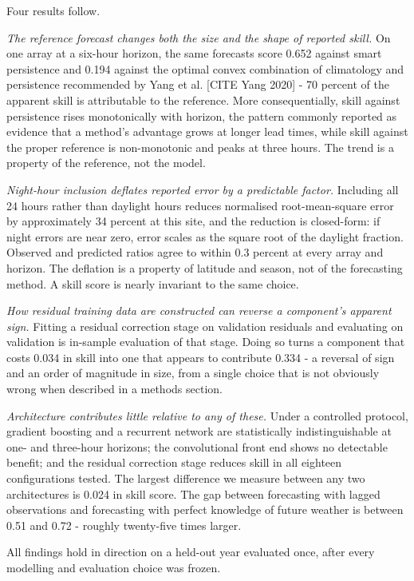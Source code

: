 Four results follow.

\textit{The reference forecast changes both the size and the shape of reported
skill.} On one array at a six-hour horizon, the same forecasts score
0.652 against smart persistence and 0.194 against the optimal convex
combination of climatology and persistence recommended by Yang et al.
[CITE Yang 2020] - 70 percent of the apparent skill is attributable to
the reference. More consequentially, skill against persistence rises
monotonically with horizon, the pattern commonly reported as evidence
that a method's advantage grows at longer lead times, while skill
against the proper reference is non-monotonic and peaks at three hours.
The trend is a property of the reference, not the model.

\textit{Night-hour inclusion deflates reported error by a predictable factor.}
Including all 24 hours rather than daylight hours reduces normalised
root-mean-square error by approximately 34 percent at this site, and
the reduction is closed-form: if night errors are near zero, error
scales as the square root of the daylight fraction. Observed and
predicted ratios agree to within 0.3 percent at every array and horizon.
The deflation is a property of latitude and season, not of the
forecasting method. A skill score is nearly invariant to the same
choice.

\textit{How residual training data are constructed can reverse a component's
apparent sign.} Fitting a residual correction stage on validation
residuals and evaluating on validation is in-sample evaluation of that
stage. Doing so turns a component that costs 0.034 in skill into one
that appears to contribute 0.334 - a reversal of sign and an order of
magnitude in size, from a single choice that is not obviously wrong when
described in a methods section.

\textit{Architecture contributes little relative to any of these.} Under a
controlled protocol, gradient boosting and a recurrent network are
statistically indistinguishable at one- and three-hour horizons; the
convolutional front end shows no detectable benefit; and the residual
correction stage reduces skill in all eighteen configurations tested.
The largest difference we measure between any two architectures is 0.024
in skill score. The gap between forecasting with lagged observations and
forecasting with perfect knowledge of future weather is between 0.51 and
0.72 - roughly twenty-five times larger.

All findings hold in direction on a held-out year evaluated once, after
every modelling and evaluation choice was frozen.

